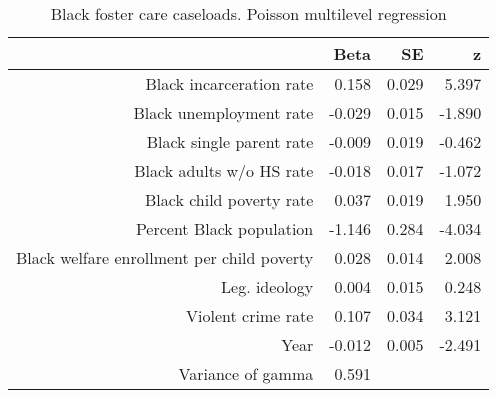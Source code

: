 \begin{table}[ht]
\centering
\caption{Black foster care caseloads. Poisson multilevel regression} 
\label{b.c.tab}
\begin{tabular}{rrrr}
  \hline
 & Beta & SE & z \\ 
  \hline
Black incarceration rate & 0.158 & 0.029 & 5.397 \\ 
  Black unemployment rate & -0.029 & 0.015 & -1.890 \\ 
  Black single parent rate & -0.009 & 0.019 & -0.462 \\ 
  Black adults w/o HS rate & -0.018 & 0.017 & -1.072 \\ 
  Black child poverty rate & 0.037 & 0.019 & 1.950 \\ 
  Percent Black population & -1.146 & 0.284 & -4.034 \\ 
  Black welfare enrollment per child poverty & 0.028 & 0.014 & 2.008 \\ 
  Leg. ideology & 0.004 & 0.015 & 0.248 \\ 
  Violent crime rate & 0.107 & 0.034 & 3.121 \\ 
  Year & -0.012 & 0.005 & -2.491 \\ 
  Variance of gamma & 0.591 &  &  \\ 
   \hline
\end{tabular}
\end{table}
